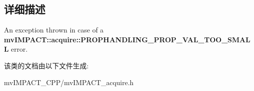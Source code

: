 \subsection{详细描述}
An exception thrown in case of a {\bfseries mv\+I\+M\+P\+A\+C\+T\+::acquire\+::\+P\+R\+O\+P\+H\+A\+N\+D\+L\+I\+N\+G\+\_\+\+P\+R\+O\+P\+\_\+\+V\+A\+L\+\_\+\+T\+O\+O\+\_\+\+S\+M\+A\+L\+L} error. 

该类的文档由以下文件生成\+:\begin{DoxyCompactItemize}
\item 
mv\+I\+M\+P\+A\+C\+T\+\_\+\+C\+P\+P/mv\+I\+M\+P\+A\+C\+T\+\_\+acquire.\+h\end{DoxyCompactItemize}

